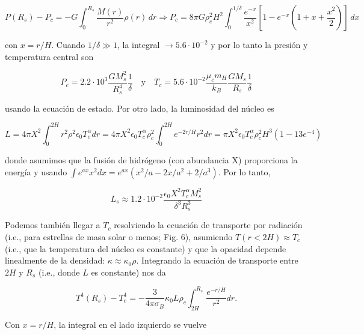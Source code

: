 \documentclass[11pt,letterpaper]{article}
\begin{document}
\begin{itemize}
    \begin{equation}
        P(R_s) - P_c = -G \int_0^{R_s} \frac{M(r)}{r^2} \rho(r) \, dr \Rightarrow P_c = 8\pi G \rho_c^2 H^2 \int_0^{1/\delta} \frac{e^{-x}}{x^2} \left[ 1 - e^{-x} \left( 1 + x + \frac{x^2}{2} \right) \right] \, dx
    \end{equation}

    con \(x = r/H\). Cuando \(1/\delta \gg 1\), la integral \(\to 5.6 \cdot 10^{-2}\) y por lo tanto la presión y temperatura central son 

    \begin{equation}
        P_c = 2.2 \cdot 10^3 \frac{GM_s^2}{R_s^4} \frac{1}{\delta} \quad \text{y} \quad T_c = 5.6 \cdot 10^{-2} \frac{\mu_c m_H}{k_B} \frac{GM_s}{R_s} \frac{1}{\delta}
    \end{equation}

    usando la ecuación de estado. Por otro lado, la luminosidad del núcleo es

    \begin{equation}
        L = 4\pi X^2 \int_0^{2H} r^2 \rho^2 \epsilon_0 T_c^\alpha dr = 4\pi X^2 \epsilon_0 T_c^\alpha \rho_c^2 \int_0^{2H} e^{-2r/H} r^2 dr = \pi X^2 \epsilon_0 T_c^\alpha \rho_c^2 H^3 (1 - 13e^{-4})
    \end{equation}

    donde asumimos que la fusión de hidrógeno (con abundancia X) proporciona la energía y usando \(\int e^{ax}x^2 dx = e^{ax}(x^2/a - 2x/a^2 + 2/a^3)\). Por lo tanto,

    \begin{equation}
        L_s \approx 1.2 \cdot 10^{-2} \frac{\epsilon_0 X^2 T_c^\alpha M_s^2}{\delta^3 R_s^3}
    \end{equation}

    Podemos también llegar a \(T_c\) resolviendo la ecuación de transporte por radiación (i.e., para estrellas de masa solar o menos; Fig. 6), asumiendo \(T(r<2H) \approx T_c\) (i.e., que la temperatura del núcleo es constante) y que la opacidad depende linealmente de la densidad: \(\kappa \approx \kappa_0 \rho\). Integrando la ecuación de transporte entre \(2H\) y \(R_s\) (i.e., donde \(L\) es constante) nos da

    \begin{equation}
        T^4(R_s) - T^4_c = -\frac{3}{4\pi\sigma_B} \kappa_0 L \rho_c \int_{2H}^{R_s} \frac{e^{-r/H}}{r^2} dr.
    \end{equation}

    Con \(x = r/H\), la integral en el lado izquierdo se vuelve 


\end{itemize}
\end{document}
